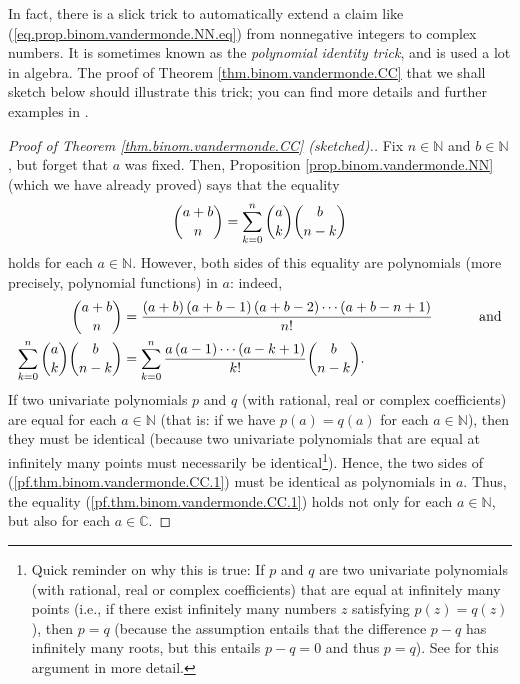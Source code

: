 In fact, there is a slick trick to automatically extend a claim like
(\ref{eq.prop.binom.vandermonde.NN.eq}) from nonnegative integers to complex
numbers. It is sometimes known as the \emph{polynomial identity trick}, and is
used a lot in algebra. The proof of Theorem \ref{thm.binom.vandermonde.CC}
that we shall sketch below should illustrate this trick; you can find more
details and further examples in \cite[\S 7.5.3]{20f}.

\begin{proof}
[Proof of Theorem \ref{thm.binom.vandermonde.CC} (sketched).]Fix
$n\in\mathbb{N}$ and $b\in\mathbb{N}$, but forget that $a$ was fixed. Then,
Proposition \ref{prop.binom.vandermonde.NN} (which we have already proved)
says that the equality%
\begin{equation}
\dbinom{a+b}{n}=\sum_{k=0}^{n}\dbinom{a}{k}\dbinom{b}{n-k}
\label{pf.thm.binom.vandermonde.CC.1}%
\end{equation}
holds for each $a\in\mathbb{N}$. However, both sides of this equality are
polynomials (more precisely, polynomial functions) in $a$: indeed,%
\begin{align*}
\dbinom{a+b}{n}  &  =\dfrac{\left(  a+b\right)  \left(  a+b-1\right)  \left(
a+b-2\right)  \cdots\left(  a+b-n+1\right)  }{n!}%
\ \ \ \ \ \ \ \ \ \ \text{and}\\
\sum_{k=0}^{n}\dbinom{a}{k}\dbinom{b}{n-k}  &  =\sum_{k=0}^{n}\dfrac{a\left(
a-1\right)  \cdots\left(  a-k+1\right)  }{k!}\dbinom{b}{n-k}.
\end{align*}
If two univariate polynomials $p$ and $q$ (with rational, real or complex
coefficients) are equal for each $a\in\mathbb{N}$ (that is: if we have
$p\left(  a\right)  =q\left(  a\right)  $ for each $a\in\mathbb{N}$), then
they must be identical (because two univariate polynomials that are equal at
infinitely many points must necessarily be identical\footnote{Quick reminder
on why this is true: If $p$ and $q$ are two univariate polynomials (with
rational, real or complex coefficients) that are equal at infinitely many
points (i.e., if there exist infinitely many numbers $z$ satisfying $p\left(
z\right)  =q\left(  z\right)  $), then $p=q$ (because the assumption entails
that the difference $p-q$ has infinitely many roots, but this entails $p-q=0$
and thus $p=q$). See \cite[Corollary 7.5.7]{20f} for this argument in more
detail.}). Hence, the two sides of (\ref{pf.thm.binom.vandermonde.CC.1}) must
be identical as polynomials in $a$. Thus, the equality
(\ref{pf.thm.binom.vandermonde.CC.1}) holds not only for each $a\in\mathbb{N}%
$, but also for each $a\in\mathbb{C}$.


\end{proof}
